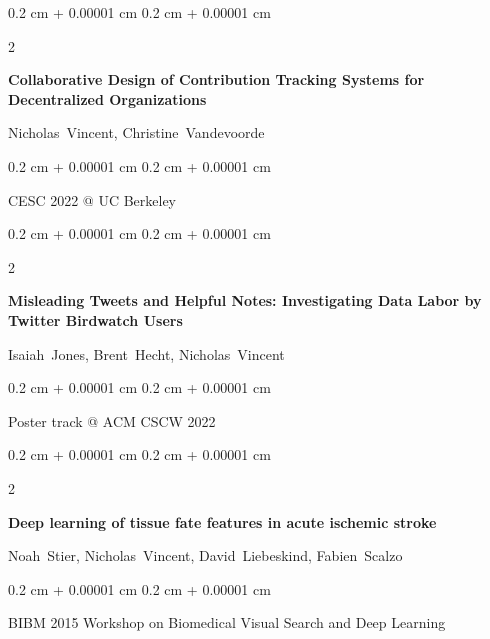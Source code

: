 \documentclass[10pt, letterpaper]{article}
\newenvironment{onecolentry}{
    \begin{adjustwidth}{
        0.2 cm + 0.00001 cm
    }{
        0.2 cm + 0.00001 cm
    }
}{
    \end{adjustwidth}
} %
\newenvironment{twocolentry}[2][]{
    \onecolentry
    \def\secondColumn{#2}
    \setcolumnwidth{\fill, 4.1 cm}
    \begin{paracol}{2}
}{
    \switchcolumn \raggedleft \secondColumn
    \end{paracol}
    \endonecolentry
} %
\begin{document}
        \vspace{0.2 cm}

        \begin{samepage}
            \begin{twocolentry}{
                2022
            }
                \textbf{Collaborative Design of Contribution Tracking Systems for Decentralized Organizations}

                \vspace{0.10 cm}

                \mbox{Nicholas Vincent}, \mbox{Christine Vandevoorde}
            \end{twocolentry}


            \vspace{0.10 cm}

            \begin{onecolentry}
        CESC 2022 @ UC Berkeley    \end{onecolentry}
        \end{samepage}

        \vspace{0.2 cm}

        \begin{samepage}
            \begin{twocolentry}{
                2022
            }
                \textbf{Misleading Tweets and Helpful Notes: Investigating Data Labor by Twitter Birdwatch Users}

                \vspace{0.10 cm}

                \mbox{Isaiah Jones}, \mbox{Brent Hecht}, \mbox{Nicholas Vincent}
            \end{twocolentry}


            \vspace{0.10 cm}

            \begin{onecolentry}
        Poster track @ ACM CSCW 2022    \end{onecolentry}
        \end{samepage}

        \vspace{0.2 cm}

        \begin{samepage}
            \begin{twocolentry}{
                2015
            }
                \textbf{Deep learning of tissue fate features in acute ischemic stroke}

                \vspace{0.10 cm}

                \mbox{Noah Stier}, \mbox{Nicholas Vincent}, \mbox{David Liebeskind}, \mbox{Fabien Scalzo}
            \end{twocolentry}


            \vspace{0.10 cm}

            \begin{onecolentry}
        BIBM 2015 Workshop on Biomedical Visual Search and Deep Learning    \end{onecolentry}
        \end{samepage}
\end{document}
